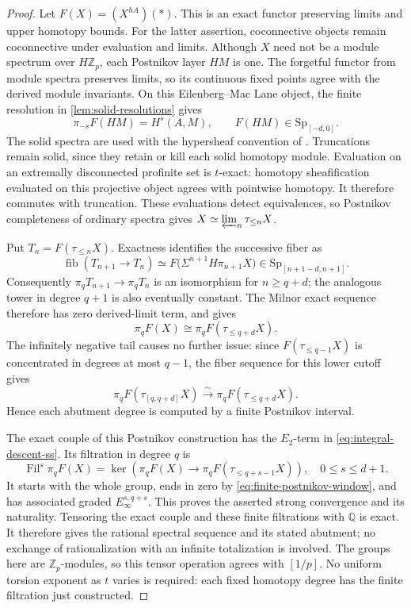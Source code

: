 \documentclass[11pt]{article}
\numberwithin{equation}{section}
\theoremstyle{definition}
\theoremstyle{remark}
\newcommand{\Q}{\mathbb Q}
\newcommand{\Z}{\mathbb Z}
\begin{document}
\begin{proof}
Let $F(X)=(X^{hA})(*)$.  This is an exact functor preserving limits and
upper homotopy bounds.  For the latter assertion, coconnective objects
remain coconnective under evaluation and limits.  Although $X$ need not
be a module spectrum over $H\Z_p$, each Postnikov layer $HM$ is one.
The forgetful functor from module spectra preserves limits, so its
continuous fixed points agree with the derived module invariants.
On this Eilenberg--Mac Lane object, the finite
resolution in \cref{lem:solid-resolutions} gives
\[
 \pi_{-s}F(HM)=H^s(A,M),\qquad
 F(HM)\in\mathrm{Sp}_{[-d,0]}.
\]
The solid spectra are used with the hypersheaf convention of
\cite[Section~4.5, especially Proposition~4.5.5]{BMR2026}.
Truncations remain solid, since they retain or kill each solid homotopy
module.  Evaluation on an extremally disconnected profinite set is
$t$-exact: homotopy sheafification evaluated on this projective object
agrees with pointwise homotopy.  It therefore commutes with truncation.
These evaluations detect equivalences, so Postnikov completeness of
ordinary spectra gives
$X\simeq\varprojlim_n\tau_{\leq n}X$.

Put $T_n=F(\tau_{\leq n}X)$.  Exactness identifies the successive fiber as
\[
 \operatorname{fib}(T_{n+1}\longrightarrow T_n)
   \simeq F\bigl(\Sigma^{n+1}H\pi_{n+1}X\bigr)
   \in\mathrm{Sp}_{[n+1-d,n+1]}.
\]
Consequently $\pi_qT_{n+1}\to\pi_qT_n$ is an isomorphism for
$n\geq q+d$; the analogous tower in degree $q+1$ is also eventually
constant.  The Milnor exact sequence therefore has zero derived-limit
term, and gives
\begin{equation}\label{eq:finite-postnikov-window}
 \pi_qF(X)\cong\pi_qF(\tau_{\leq q+d}X).
\end{equation}
The infinitely negative tail causes no further issue: since
$F(\tau_{\leq q-1}X)$ is concentrated in degrees at most $q-1$, the
fiber sequence for this lower cutoff gives
\[
 \pi_qF(\tau_{[q,q+d]}X)
     \xrightarrow{\ \sim\ }\pi_qF(\tau_{\leq q+d}X).
\]
Hence each abutment degree is computed by a finite Postnikov interval.

The exact couple of this Postnikov construction has the $E_2$-term in
\eqref{eq:integral-descent-ss}.  Its filtration in degree $q$ is
\[
 \operatorname{Fil}^{s}\pi_qF(X)
 =\ker\!\left(\pi_qF(X)\longrightarrow
              \pi_qF(\tau_{\leq q+s-1}X)\right),
 \quad 0\leq s\leq d+1.
\]
It starts with the whole group, ends in zero by
\eqref{eq:finite-postnikov-window}, and has associated graded
$E_\infty^{s,q+s}$.  This proves the asserted strong convergence and its
naturality.  Tensoring the exact couple and these finite filtrations with
$\Q$ is exact.  It therefore gives the rational spectral sequence and
its stated abutment; no exchange of rationalization with an infinite
totalization is involved.  The groups here are $\Z_p$-modules, so this
tensor operation agrees with $[1/p]$.
No uniform torsion exponent as $t$ varies is required: each fixed
homotopy degree has the finite filtration just constructed.
\end{proof}
\end{document}

